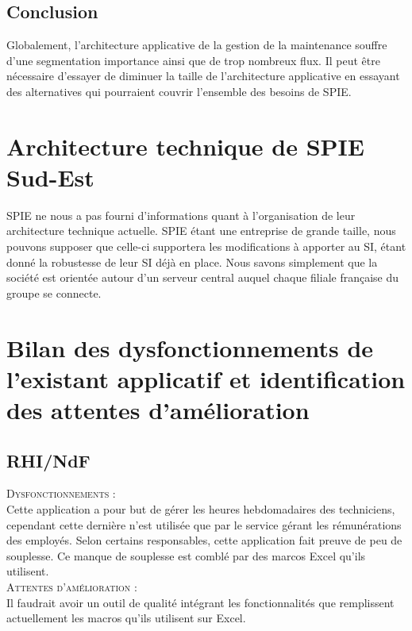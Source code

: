 \subsection{Conclusion}

Globalement, l’architecture applicative de la gestion de la maintenance souffre d’une segmentation importance ainsi que de trop nombreux flux. Il peut être nécessaire d’essayer de diminuer la taille de l’architecture applicative en essayant des alternatives qui pourraient couvrir l’ensemble des besoins de SPIE.

\section{Architecture technique de SPIE Sud-Est}

SPIE ne nous a pas fourni d’informations quant à l’organisation de leur architecture technique actuelle. SPIE étant une entreprise de grande taille, nous pouvons supposer que celle-ci supportera les modifications à apporter au SI, étant donné la robustesse de leur SI déjà en place.
Nous savons simplement que la société est orientée autour d’un serveur central auquel chaque filiale française du groupe se connecte.

\section{Bilan des dysfonctionnements de l’existant applicatif et identification des attentes d’amélioration}

\subsection{RHI/NdF}

\noindent\textsc{Dysfonctionnements} : \\

Cette application a pour but de gérer les heures hebdomadaires des techniciens, cependant cette dernière n’est utilisée que par le service gérant les rémunérations des employés. Selon certains responsables, cette application fait preuve de peu de souplesse. Ce manque de souplesse est comblé par des marcos Excel qu’ils utilisent. \\

\noindent\textsc{Attentes d’amélioration} : \\

Il faudrait avoir un outil de qualité intégrant les fonctionnalités que remplissent actuellement les macros qu’ils utilisent sur Excel.

